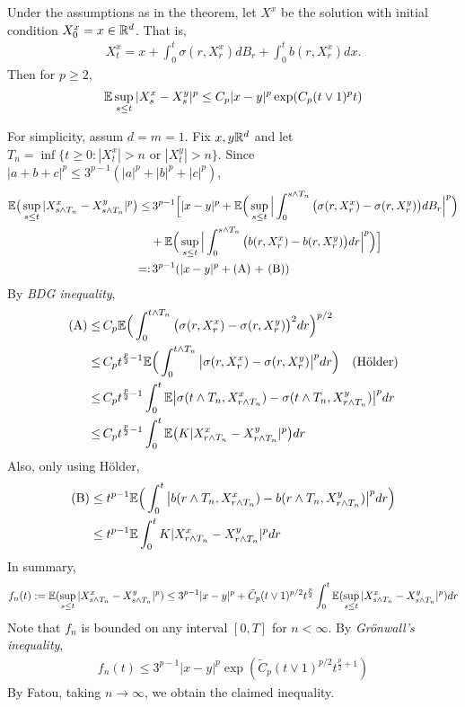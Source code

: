 \documentclass[12pt,a4paper]{article}
\newenvironment{proof}
{\begin{changemargin}{0.5cm}{0.5cm} 
	}%
	{\end{changemargin}
}
\newenvironment{p}
{\begin{proof} 
	}%
	{\end{proof}
}
\begin{document}
\prop Under the assumptions as in the theorem, let $X^x$ be the solution with initial condition $X_0^x =x \in \mathbb{R}^d$. That is,
\begin{align*}
X_t^x = x+ \int_0^t \sigma(r, X_r^x) dB_r + \int_0^t b(r, X_r^x) dx.
\end{align*}
Then for $p\geq 2$,
\begin{align*}
\mathbb{E} \sup_{s\leq t} |X_s^x - X_s^y|^p \leq C_p |x-y|^p \exp (C_p (t\vee 1)^p t)
\end{align*}
\begin{p}
\pf For simplicity, assum $d=m=1$. Fix $x, y\mathbb{R}^d$ and let $T_n =\inf \{t\geq 0 : |X_t^x|>n \text{ or } |X_t^y| >n \}$. Since $|a+b+c|^p \leq 3^{p-1}(|a|^p + |b|^p + |c|^p)$,
\begin{align*}
\mathbb{E} \big( \sup_{s\leq t} |X^x_{s\wedge T_n} -  X^y_{s\wedge T_n}|^p  \big) \leq & \,3^{p-1} \Big[ |x-y|^p + \mathbb{E} \Big( \sup_{s\leq t} \Big| \int_0^{s\wedge T_n} \big( \sigma(r, X_r^x) - \sigma(r, X_r^y)\big) dB_r \Big|^p \Big) \\
& + \mathbb{E} \Big( \sup_{s\leq t} \Big| \int_0^{s\wedge T_n} \big( b(r, X_r^x) - b(r, X_r^y)\big) dr \Big|^p \Big) \Big] \\
=: & \, 3^{p-1}( |x-y|^p + \text{(A) + (B)} )
\end{align*}
By \emph{BDG inequality},
\begin{align*}
\text{(A)} \leq &\, C_p \mathbb{E} \Big( \int_0^{t\wedge T_n} \big( \sigma(r, X_r^x) - \sigma(r, X_r^y) \big)^2 dr \Big)^{p/2} \\
\leq &\, C_p t^{\frac{p}{2} -1} \mathbb{E} \Big( \int_0^{t\wedge T_n} \big| \sigma(r, X_r^x) - \sigma(r, X_r^y) \big|^p dr \Big) \quad \text{(H\"older)} \\
\leq &\, C_p t^{\frac{p}{2} - 1} \int_0^t \mathbb{E} \big| \sigma(t \wedge T_n, X_{r\wedge T_n}^x) -\sigma(t \wedge T_n, X_{r\wedge T_n}^y) \big|^p dr \\
\leq &\, C_p t^{\frac{p}{2} - 1} \int_0^t \mathbb{E} \big( K |X^x_{r\wedge T_n} - X^y_{r\wedge T_n}|^p \big) dr
\end{align*}
Also, only using H\"older,
\begin{align*}
\text{(B)} & \leq t^{p-1} \mathbb{E} \Big(\int_0^t \big| b(r\wedge T_n, X^x_{r\wedge T_n}) - b(r\wedge T_n, X^y_{r\wedge T_n})\big|^p dr \Big) \\
& \leq t^{p-1} \mathbb{E} \int_0^t K |X^x_{r\wedge T_n} - X^y_{r\wedge T_n}|^p dr
\end{align*}
In summary,
\begin{align*}
f_n(t) := \mathbb{E} (\sup_{s\leq t} |X^x_{s\wedge T_n} - X^y_{s\wedge T_n}|^p ) \leq 3^{p-1} |x-y|^p + \tilde{C}_p (t\vee 1)^{p/2} t^{\frac{p}{2}} \int_0^t \mathbb{E} (\sup_{s\leq t} |X^x_{s\wedge T_n} - X^y_{s\wedge T_n}|^p) dr
\end{align*}
Note that $f_n$ is bounded on any interval $[0, T]$ for $n< \infty$. By \emph{Gr\"onwall's inequality}, 
\begin{align*}
f_n(t) \leq 3^{p-1} |x-y|^p \exp (\tilde{C}_p (t\vee 1)^{p/2} t^{\frac{p}{2}+1})
\end{align*}
By Fatou, taking $n\rightarrow \infty$, we obtain the claimed inequality. 

\eop
\end{p}
\s
\end{document}
